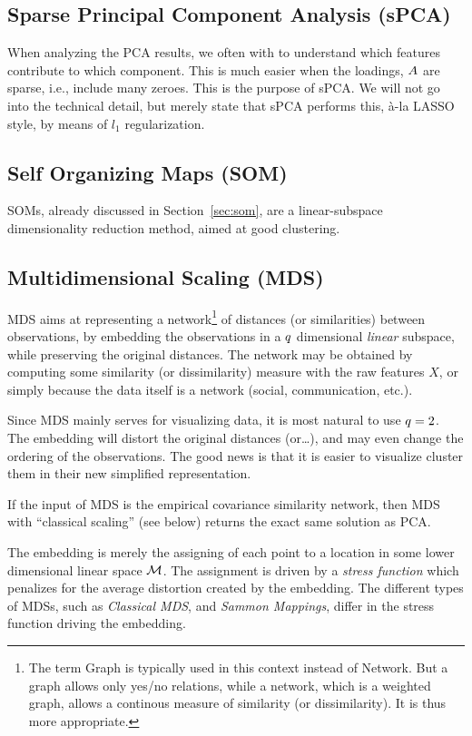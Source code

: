\subsection{Sparse Principal Component Analysis (sPCA)}
\label{sec:spca}

When analyzing the PCA results, we often with to understand which features contribute to which component. 
This is much easier when the loadings, $A$ are sparse, i.e., include many zeroes. 
This is the purpose of sPCA. 
We will not go into the technical detail, but merely state that sPCA performs this, \`a-la LASSO style, by means of $l_1$ regularization.



\subsection{Self Organizing Maps (SOM)}
SOMs, already discussed in Section~\ref{sec:som}, are a linear-subspace dimensionality reduction method, aimed at good clustering. 


\subsection{Multidimensional Scaling (MDS)}
\label{sec:mds}

MDS aims at representing a network\footnote{The term Graph is typically used in this context instead of Network. But a graph allows only yes/no relations, while a network, which is a weighted graph, allows a continous measure of similarity (or dissimilarity). It is thus more appropriate.} of distances (or similarities) between observations, by embedding the observations in a $q$ dimensional \emph{linear} subspace, while preserving the original distances.
The network may be obtained by computing some similarity (or dissimilarity) measure with the raw features $X$, or simply because the data itself is a network (social, communication, etc.).

Since MDS mainly serves for visualizing data, it is most natural to use $q=2$. 
The embedding will distort the original distances (or\dots), and may even change the ordering of the observations. The good news is that it is easier to visualize \andor cluster them in their new simplified representation. 

If the input of MDS is the empirical covariance similarity network, then MDS with ``classical scaling'' (see below) returns the exact same solution as PCA.

The embedding is merely the assigning of each point to a location in some lower dimensional linear space $\mathcal{M}$. 
The assignment is driven by a \emph{stress function} which penalizes for the average distortion created by the embedding.
The different types of MDSs, such as \emph{Classical MDS}, and \emph{Sammon Mappings}, differ in the stress function driving the embedding.

